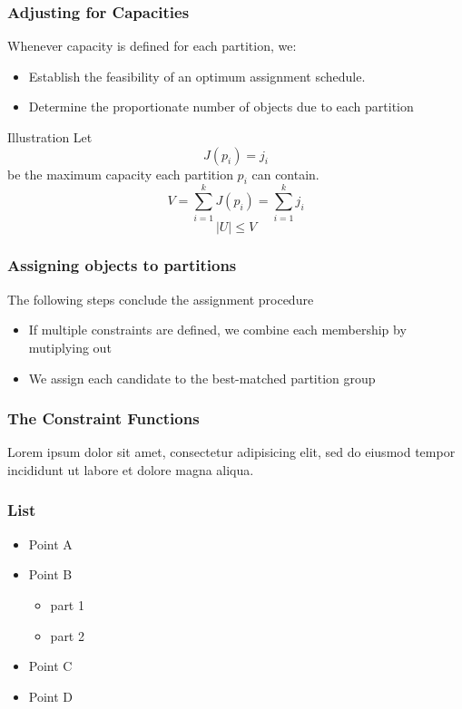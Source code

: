 \documentclass[10pt]{beamer}
\begin{document}
			
			\begin{frame}
				\frametitle{Adjusting for Capacities}
				Whenever capacity is defined for each partition, we:
				\begin{itemize}
					\item Establish the feasibility of an optimum assignment schedule.
					\item Determine the proportionate number of objects due to each partition
				\end{itemize}
				\vfill
				\begin{block}{Illustration}
					Let 
					\begin{equation}
						J(p_i) = j_i
					\end{equation}
					be the maximum capacity each partition $p_i$ can contain.
					\begin{equation}
						V = \sum_{ i = 1 }^{k}{J(p_i)} = \sum_{i=1}^{k}{j_i}
					\end{equation}
					\begin{equation}
						\mid U \mid \leq V
					\end{equation}
				\end{block}
			\end{frame}
			
			\begin{frame}
				\frametitle{Assigning objects to partitions}
				The following steps conclude the assignment procedure
				\begin{itemize}
					\item If multiple constraints are defined, we combine each membership by mutiplying out
					\item We assign each candidate to the best-matched partition group
				\end{itemize}
			\end{frame}
			
			\begin{frame}
				\frametitle{The Constraint Functions}
				Lorem ipsum dolor sit amet, consectetur adipisicing elit, sed do eiusmod tempor incididunt ut labore et dolore magna aliqua.
			\end{frame}
			
			
		\begin{frame}
			\frametitle{List}
			\begin{itemize}
				\item Point A
				\item Point B
				\begin{itemize}
					\item part 1
					\item part 2
				\end{itemize}
				\item Point C
				\item Point D
			\end{itemize}
		\end{frame}
		
\end{document}

